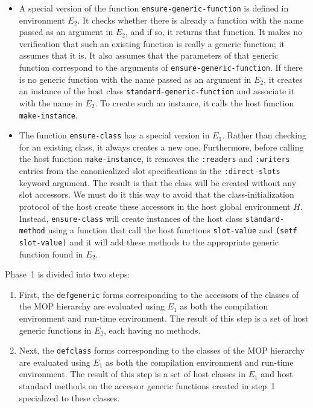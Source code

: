 \begin{itemize}
\item A special version of the function
  \texttt{ensure-generic-function} is defined in environment $E_2$.
  It checks whether there is already a function with the name passed
  as an argument in $E_2$, and if so, it returns that function.  It
  makes no verification that such an existing function is really a
  generic function; it assumes that it is.  It also assumes that the
  parameters of that generic function correspond to the arguments of
  \texttt{ensure-generic-function}.  If there is no generic function
  with the name passed as an argument in $E_2$, it creates an instance
  of the host class \texttt{standard-generic-function} and associate
  it with the name in $E_2$.  To create such an instance, it calls the
  host function \texttt{make-instance}.
\item The function \texttt{ensure-class} has a special version in
  $E_1$.  Rather than checking for an existing class, it always
  creates a new one.  Furthermore, before calling the host function
  \texttt{make-instance}, it removes the \texttt{:readers} and
  \texttt{:writers} entries from the canonicalized slot specifications
  in the \texttt{:direct-slots} keyword argument.  The result is that
  the class will be created without any slot accessors.  We must do it
  this way to avoid that the class-initialization protocol of the host
  create these accessors in the host global environment $H$.  Instead,
  \texttt{ensure-class} will create instances of the host class
  \texttt{standard-method} using a function that call the host
  functions \texttt{slot-value} and \texttt{(setf slot-value)} and it
  will add these methods to the appropriate generic function found in
  $E_2$.
\end{itemize}

Phase~1 is divided into two steps:

\begin{enumerate}
\item First, the \texttt{defgeneric} forms corresponding to the
  accessors of the classes of the MOP hierarchy are evaluated using
  $E_1$ as both the compilation environment and run-time environment.
  The result of this step is a set of host generic functions in $E_2$,
  each having no methods.
\item Next, the \texttt{defclass} forms corresponding to the classes
  of the MOP hierarchy are evaluated using $E_1$ as both the
  compilation environment and run-time environment.  The result of
  this step is a set of host classes in $E_1$ and host standard
  methods on the accessor generic functions created in step~1
  specialized to these classes.
\end{enumerate}

